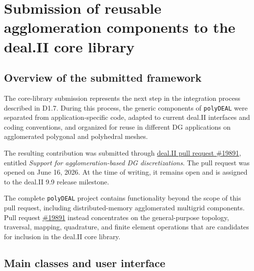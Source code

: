 \documentclass[a4paper,12pt]{article}
\begin{document}
\section{{Submission of reusable agglomeration components to the
deal.II core library}}
\label{sec:core_pr}

\subsection{{Overview of the submitted framework}}
The core-library submission represents the next step in the integration
process described in D1.7. During this process, the generic components of
\texttt{polyDEAL} were separated from application-specific code, adapted to
current deal.II interfaces and coding conventions, and organized for reuse in
different DG applications on agglomerated polygonal and polyhedral meshes.

The resulting contribution was submitted through
\href{https://github.com/dealii/dealii/pull/19891}{deal.II pull request
\#19891}, entitled \emph{Support for agglomeration-based DG
discretizations}. The pull request was opened on June 16, 2026. At the time
of writing, it remains open and is assigned to the deal.II 9.9 release
milestone.


The complete \texttt{polyDEAL} project contains functionality beyond the
scope of this pull request, including distributed-memory agglomerated
multigrid components. Pull request \href{https://github.com/dealii/dealii/pull/19891}{\#19891} instead concentrates on the
general-purpose topology, traversal, mapping, quadrature, and finite element
operations that are candidates for inclusion in the deal.II core library.

\subsection{{Main classes and user interface}}
\end{document}
